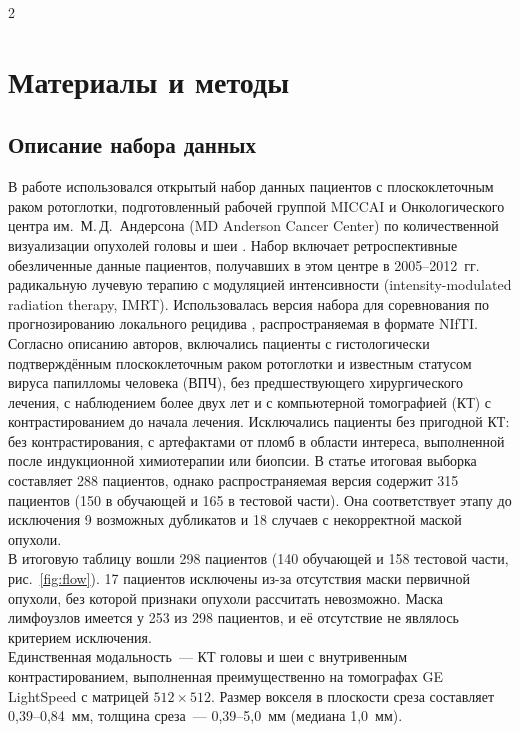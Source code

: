 \documentclass[11pt, a4paper]{article}
\begin{document}
\thispagestyle{firstpage}

\begin{multicols}{2}
\section*{Материалы и методы}

\subsection*{Описание набора данных}

В работе использовался открытый набор данных пациентов с плоскоклеточным раком ротоглотки, подготовленный рабочей группой MICCAI и Онкологического центра им.~М.\,Д.~Андерсона (MD Anderson Cancer Center) по количественной визуализации опухолей головы и шеи \cite{Elhalawani2017}. Набор включает ретроспективные обезличенные данные пациентов, получавших в этом центре в 2005--2012~гг. радикальную лучевую терапию с модуляцией интенсивности (intensity-modulated radiation therapy, IMRT). Использовалась версия набора для соревнования по прогнозированию локального рецидива \cite{KaggleOPC}, распространяемая в формате NIfTI.\vspace{6pt}\\
Согласно описанию авторов, включались пациенты с гистологически подтверждённым плоскоклеточным раком ротоглотки и известным статусом вируса папилломы человека (ВПЧ), без предшествующего хирургического лечения, с наблюдением более двух лет и с компьютерной томографией (КТ) с контрастированием до начала лечения. Исключались пациенты без пригодной КТ: без контрастирования, с артефактами от пломб в области интереса, выполненной после индукционной химиотерапии или биопсии. В статье итоговая выборка составляет 288 пациентов, однако распространяемая версия содержит 315 пациентов (150 в обучающей и 165 в тестовой части). Она соответствует этапу до исключения 9 возможных дубликатов и 18 случаев с некорректной маской опухоли.\vspace{6pt}\\
В итоговую таблицу вошли 298 пациентов (140 обучающей и 158 тестовой части, рис.~\ref{fig:flow}). 17 пациентов исключены из-за отсутствия маски первичной опухоли, без которой признаки опухоли рассчитать невозможно. Маска лимфоузлов имеется у 253 из 298 пациентов, и её отсутствие не являлось критерием исключения.\vspace{6pt}\\
Единственная модальность~--- КТ головы и шеи с внутривенным контрастированием, выполненная преимущественно на томографах GE LightSpeed с матрицей $512\times512$. Размер вокселя в плоскости среза составляет 0,39--0,84~мм, толщина среза~--- 0,39--5,0~мм (медиана 1,0~мм).\vspace{6pt}\\

\end{multicols}
\end{document}
